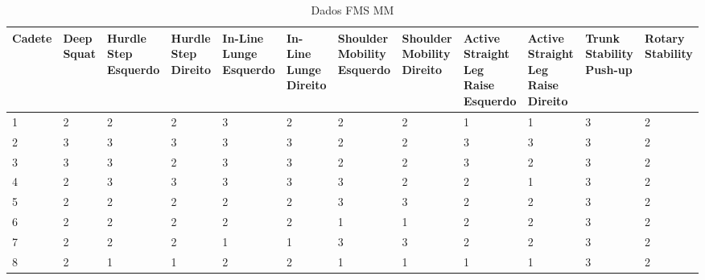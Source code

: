 \begin{landscape}
    
    \begin{table}[h]
        \centering
        \caption{Dados FMS \acrlong{MM}}
        \renewcommand{\arraystretch}{1.3}  %
        \begin{adjustbox}{scale=0.9}
        \begin{tabular}{|p{1.8cm}|p{1.6cm}|p{1.6cm}|p{1.6cm}|p{1.6cm}|p{1.6cm}|p{1.6cm}|p{1.6cm}|p{1.6cm}|p{1.6cm}|p{1.6cm}|p{1.6cm}|}
            \hline
            \textbf{Cadete} & \textbf{Deep Squat} & \textbf{Hurdle Step Esquerdo} & \textbf{Hurdle Step Direito} & \textbf{In-Line Lunge Esquerdo} & \textbf{In-Line Lunge Direito} & \textbf{Shoulder Mobility Esquerdo} & \textbf{Shoulder Mobility Direito} & \textbf{Active Straight Leg Raise Esquerdo} & \textbf{Active Straight Leg Raise Direito} & \textbf{Trunk Stability Push-up} & \textbf{Rotary Stability} \\
            \hline
            1 & 2 & 2 & 2 & 3 & 2 & 2 & 2 & 1 & 1 & 3 & 2 \\
            2 & 3 & 3 & 3 & 3 & 3 & 2 & 2 & 3 & 3 & 3 & 2 \\
            3 & 3 & 3 & 2 & 3 & 3 & 2 & 2 & 3 & 2 & 3 & 2 \\
            4 & 2 & 3 & 3 & 3 & 3 & 3 & 2 & 2 & 1 & 3 & 2 \\
            5 & 2 & 2 & 2 & 2 & 2 & 3 & 3 & 2 & 2 & 3 & 2 \\
            6 & 2 & 2 & 2 & 2 & 2 & 1 & 1 & 2 & 2 & 3 & 2 \\
            7 & 2 & 2 & 2 & 1 & 1 & 3 & 3 & 2 & 2 & 3 & 2 \\
            8 & 2 & 1 & 1 & 2 & 2 & 1 & 1 & 1 & 1 & 3 & 2 \\
            \hline
        \end{tabular}
        \end{adjustbox}
    \end{table}
    

\end{landscape}

